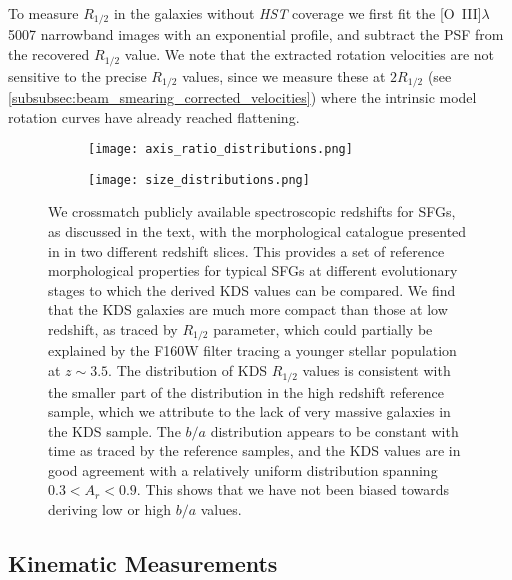 \documentclass[fleqn,usenatbib]{mn2e}
\begin{document}
To measure $R_{1/2}$ in the galaxies without {\em HST} coverage we first fit the [O~{\sc III}]$\lambda$5007 narrowband images with an exponential profile, and subtract the PSF from the recovered $R_{1/2}$ value.
We note that the extracted rotation velocities are not sensitive to the precise $R_{1/2}$ values, since we measure these at $2R_{1/2}$ (see \cref{subsubsec:beam_smearing_corrected_velocities}) where the intrinsic model rotation curves have already reached flattening. \\

\begin{figure*}
    \centering \hspace{-2.0cm}
    \begin{subfigure}[h!]{0.50\textwidth}
        \centering
        \texttt{[image: axis\_ratio\_distributions.png]}
    \end{subfigure} \hspace{0.4cm}
    \begin{subfigure}[h!]{0.50\textwidth}
        \centering
        \texttt{[image: size\_distributions.png]}
    \end{subfigure}
    \caption{We crossmatch publicly available spectroscopic redshifts for SFGs, as discussed in the text, with the morphological catalogue presented in \protect\cite{VanderWel2012} in two different redshift slices.
    This provides a set of reference morphological properties for typical SFGs at different evolutionary stages to which the derived KDS values can be compared.
    We find that the KDS galaxies are much more compact than those at low redshift, as traced by $R_{1/2}$ parameter, which could partially be explained by the F160W filter tracing a younger stellar population at $z\sim3.5$.
    The distribution of KDS $R_{1/2}$ values is consistent with the smaller part of the distribution in the high redshift reference sample, which we attribute to the lack of very massive galaxies in the KDS sample.
    The $b/a$ distribution appears to be constant with time as traced by the reference samples, and the KDS values are in good agreement with a relatively uniform distribution spanning $0.3 < A_{r} < 0.9$.
    This shows that we have not been biased towards deriving low or high $b/a$ values.}
    \label{fig:morpho-distributions}
\end{figure*}

\subsection{Kinematic Measurements}\label{subsection:kinematic_measurements}
\end{document}
